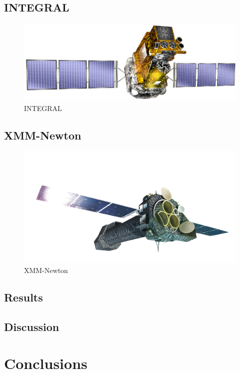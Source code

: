 \documentclass[oneside,a4paper,11pt]{report}
\begin{document}
\section{INTEGRAL}

\begin{figure}[!hbt]
\centering
\includegraphics[totalheight=4cm]{integral}
\caption{INTEGRAL}
\label{microblazar} 
\end{figure}


\section{XMM-Newton}

\begin{figure}[!hbt]
\centering
\includegraphics[totalheight=6cm]{XMM}
\caption{XMM-Newton }
\label{microblazar} 
\end{figure}


\section{Results}
\section{Discussion}
\chapter{Conclusions}
\end{document}
